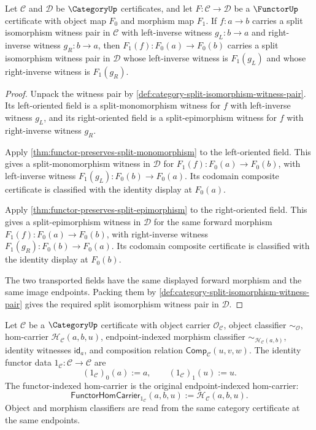 \begin{theorem}
\label{thm:functor-preserves-split-isomorphism-witness-pair}
Let $\mathcal C$ and $\mathcal D$ be $\CategoryUp$ certificates, and let
$F:\mathcal C\to\mathcal D$ be a $\FunctorUp$ certificate with object map
$F_0$ and morphism map $F_1$. If $f:a\to b$ carries a split isomorphism
witness pair in $\mathcal C$ with left-inverse witness $g_L:b\to a$ and
right-inverse witness $g_R:b\to a$, then
$F_1(f):F_0(a)\to F_0(b)$ carries a split isomorphism witness pair in
$\mathcal D$ whose left-inverse witness is $F_1(g_L)$ and whose right-inverse
witness is $F_1(g_R)$.
\end{theorem}
\begin{proof}
Unpack the witness pair by
\autoref{def:category-split-isomorphism-witness-pair}. Its left-oriented field
is a split-monomorphism witness for $f$ with left-inverse witness $g_L$, and
its right-oriented field is a split-epimorphism witness for $f$ with
right-inverse witness $g_R$.

Apply \autoref{thm:functor-preserves-split-monomorphism} to the left-oriented
field. This gives a split-monomorphism witness in $\mathcal D$ for
$F_1(f):F_0(a)\to F_0(b)$, with left-inverse witness
$F_1(g_L):F_0(b)\to F_0(a)$. Its codomain composite certificate is classified
with the identity display at $F_0(a)$.

Apply \autoref{thm:functor-preserves-split-epimorphism} to the right-oriented
field. This gives a split-epimorphism witness in $\mathcal D$ for the same
forward morphism $F_1(f):F_0(a)\to F_0(b)$, with right-inverse witness
$F_1(g_R):F_0(b)\to F_0(a)$. Its codomain composite certificate is classified
with the identity display at $F_0(b)$.

The two transported fields have the same displayed forward morphism and the
same image endpoints. Packing them by
\autoref{def:category-split-isomorphism-witness-pair} gives the required split
isomorphism witness pair in $\mathcal D$.
\end{proof}

\begin{definition}
\label{def:identity-functor-certificate-data}
Let $\mathcal C$ be a $\CategoryUp$ certificate with object carrier
$\mathcal O_{\mathcal C}$, object classifier $\sim_{\mathcal O}$,
hom-carrier $\mathcal H_{\mathcal C}(a,b,u)$, endpoint-indexed morphism
classifier $\sim_{\mathcal H_{\mathcal C}(a,b)}$, identity witnesses
$\mathsf{id}_a$, and composition relation
$\mathsf{Comp}_{\mathcal C}(u,v,w)$. The identity functor data
$1_{\mathcal C}:\mathcal C\to\mathcal C$ are
$$
(1_{\mathcal C})_0(a):=a,
\qquad
(1_{\mathcal C})_1(u):=u.
$$
The functor-indexed hom-carrier is the original endpoint-indexed hom-carrier:
$$
\mathsf{FunctorHomCarrier}_{1_{\mathcal C}}(a,b,u)
:=\mathcal H_{\mathcal C}(a,b,u).
$$
Object and morphism classifiers are read from the same category certificate at
the same endpoints.
\end{definition}

